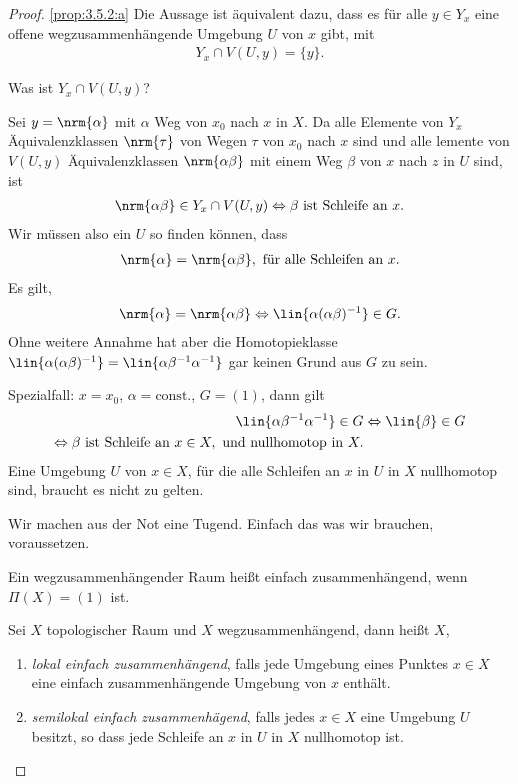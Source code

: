 \begin{proof}
\ref{prop:3.5.2:a} Die Aussage ist äquivalent dazu, dass es für alle $y\in Y_x$
eine offene wegzusammenhängende Umgebung $U$ von $x$ gibt, mit
\begin{align*}
Y_x\cap V(U,y) = \{y\}.
\end{align*}
\begin{bemn}[Frage:]
Was ist $Y_x\cap V(U,y)$?
\end{bemn}
Sei $y=\nrm{\alpha}$ mit $\alpha$ Weg von $x_0$ nach $x$ in $X$. Da alle
Elemente von $Y_x$ Äquivalenzklassen $\nrm{\tau}$ von Wegen $\tau$ von $x_0$
nach $x$ sind und alle lemente von $V(U,y)$ Äquivalenzklassen
$\nrm{\alpha\beta}$ mit einem Weg $\beta$ von $x$ nach $z$ in $U$ sind, ist
\begin{align*}
\nrm{\alpha\beta}\in Y_x\cap V(U,y) \Leftrightarrow \beta \text{ ist Schleife
an $x$}.
\end{align*}
Wir müssen also ein $U$ so finden können, dass
\begin{align*}
\nrm{\alpha} =\nrm{\alpha\beta}, \text{ für alle Schleifen an }x.
\end{align*}
Es gilt,
\begin{align*}
\nrm{\alpha}= \nrm{\alpha\beta} \Leftrightarrow
\lin{\alpha(\alpha\beta)^{-1}}\in G.
\end{align*}
Ohne weitere Annahme hat aber die Homotopieklasse
$\lin{\alpha(\alpha\beta)^{-1}} = \lin{\alpha\beta^{-1}\alpha^{-1}}$ gar keinen
Grund aus $G$ zu sein.

Spezialfall: $x = x_0$, $\alpha=\text{const.}$, $G=(1)$, dann gilt
\begin{align*}
\lin{\alpha\beta^{-1}\alpha^{-1}} \in G &\Leftrightarrow \lin{\beta}\in G
\\ \Leftrightarrow \beta\text{ ist Schleife an }x\in X,\text{ und nullhomotop in
}X.
\end{align*}
Eine Umgebung $U$ von $x\in X$, für die alle Schleifen an $x$ in $U$ in $X$
nullhomotop sind, braucht es nicht zu gelten.

Wir machen aus der Not eine Tugend. Einfach das was wir brauchen, voraussetzen.

\begin{bemn}[Erinnerung]
Ein wegzusammenhängender Raum heißt einfach zusammenhängend, wenn
$\Pi(X)  = (1)$ ist.\maphere
\end{bemn}

\begin{defn}
\label{defn:3.5.3}
Sei $X$ topologischer Raum und $X$ wegzusammenhängend, dann heißt $X$,
\begin{enumerate}[label=\roman{*})]
  \item\label{defn:3.5.3:1} \emph{lokal einfach zusammenhängend}, falls jede
  Umgebung eines Punktes $x\in X$ eine einfach zusammenhängende Umgebung von $x$ enthält.
  \item\label{defn:3.5.3:2} \emph{semilokal einfach zusammenhägend}, falls
  jedes $x\in X$ eine Umgebung $U$ besitzt, so dass jede Schleife an $x$ in $U$ in $X$ nullhomotop
  ist.\fishhere
\end{enumerate}
\end{defn}
\end{proof}

